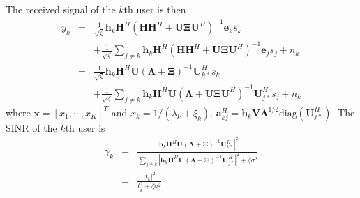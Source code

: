 \documentclass[12pt,journal,draftclsnofoot,onecolumn]{IEEEtran}
\begin{document}
The received signal of the $k$th user is then
\begin{eqnarray}
y_k 
&=&\frac{1}{\sqrt{\zeta}}\mathbf{h}_k\mathbf{H}^H\left(\mathbf{H}\mathbf{H}^H + \mathbf{U}\mathbf{\Xi}\mathbf{U}^H\right)^{-1}\mathbf{e}_{k}s_k \nonumber \\ 
&&+\frac{1}{\sqrt{\zeta}}\sum_{j \neq k}\mathbf{h}_k\mathbf{H}^H\left(\mathbf{H}\mathbf{H}^H + \mathbf{U}\mathbf{\Xi}\mathbf{U}^{H}\right)^{-1}\mathbf{e}_js_j + n_k\\
 &=&\frac{1}{\sqrt{\zeta}}\mathbf{h}_k\mathbf{H}^H\mathbf{U}\left(\mathbf{\Lambda} + \mathbf{\Xi}\right)^{-1}\mathbf{U}_{k*}^Hs_k \nonumber\\
&&+ \frac{1}{\sqrt{\zeta}}\sum_{j \neq k}\mathbf{h}_k\mathbf{H}^H\mathbf{U}\left(\mathbf{\Lambda} + \mathbf{U}\mathbf{\Xi}\mathbf{U}^H\right)^{-1}\mathbf{U}_{j*}^Hs_j + n_k
\end{eqnarray}
%
where $\mathbf{x} = [x_1,\cdots,x_K]^T$ and $x_k = 1/(\lambda_k + \xi_k)$. $\mathbf{a}_{kj}^H = \mathbf{h}_k\mathbf{V}\mathbf{\Lambda}^{1/2}\mathrm{diag}(\mathbf{U}_{j*}^H)$.
The SINR of the $k$th user is
\begin{eqnarray}
\gamma_k &=& \frac{ |\mathbf{h}_k\mathbf{H}^H\mathbf{U}\left(\mathbf{\Lambda} + \mathbf{\Xi}\right)^{-1}\mathbf{U}_{k*}^H|^2}{\sum_{j \neq k}|\mathbf{h}_k\mathbf{H}^H\mathbf{U}\left(\mathbf{\Lambda} + \mathbf{\Xi}\right)^{-1}\mathbf{U}_{j*}^H|^2 + \zeta\sigma^2}\\
&=&\frac{|t_k|^2}{t_{\tilde{k}}^2 + \zeta \sigma^2}
\end{eqnarray}
\end{document}
